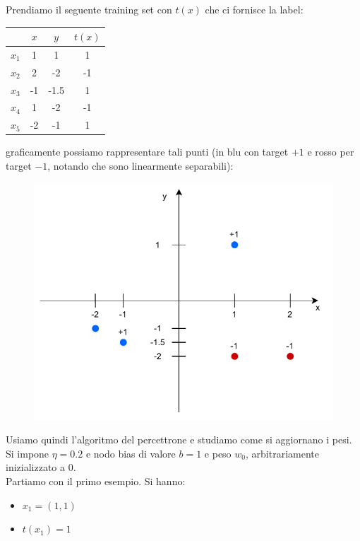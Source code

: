 \documentclass[a4paper,12pt, oneside]{book}
\begin{document}
\begin{esercizio}
  Prendiamo il seguente training set con $t(x)$ che ci fornisce la label:
  \begin{table}[H]
    \centering
    \begin{tabular}{c||c|c|c}
      & $x$ & $y$ & $t(x)$\\
      \hline
      \hline
      $x_1$ & 1 & 1 & 1 \\
      $x_2$ & 2 & -2 & -1 \\
      $x_3$ & -1 & -1.5 & 1 \\
      $x_4$ & 1 & -2 & -1 \\
      $x_5$ & -2 & -1 & 1 \\
    \end{tabular}
  \end{table}
  graficamente possiamo rappresentare tali punti (in blu con target $+1$ e rosso
  per target $-1$, notando che sono linearmente separabili):
  \begin{figure}[H]
    \centering
    \includegraphics[scale = 0.8]{img/per1.pdf}
  \end{figure}
  Usiamo quindi l'algoritmo del percettrone e studiamo come si aggiornano i
  pesi. Si impone $\eta=0.2$ e nodo bias di valore $b=1$ e peso $w_0$,
  arbitrariamente inizializzato a 0.\\ 
  Partiamo con il primo esempio. Si hanno:
  \begin{itemize}
    \item $x_1=(1,1)$
    \item $t(x_1)=1$
  \end{itemize}

\end{esercizio}
\end{document}

